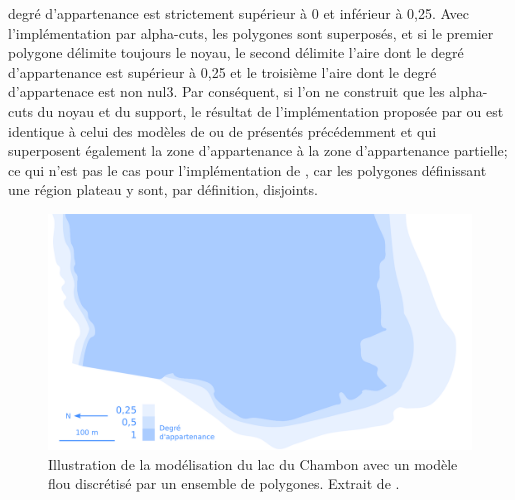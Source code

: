 degré d’appartenance est strictement supérieur à 0 et inférieur à
0,25. Avec l’implémentation par alpha-cuts, les polygones sont
superposés, et si le premier polygone délimite toujours le noyau, le
second délimite l’aire dont le degré d’appartenance est supérieur à
0,25 et le troisième l’aire dont le degré d’appartenace est non
nul3. Par conséquent, si l’on ne construit que les alpha-cuts du noyau
et du support, le résultat de l’implémentation proposée par
\textcite{Zoghalmi2013,Zoghalmi2016} ou \textcite{de Runz2008} est
identique à celui des modèles de \textcite{Cohn1996} ou de
\textcite{Clementini1996} présentés précédemment et qui superposent
également la zone d’appartenance à la zone d’appartenance partielle;
ce qui n’est pas le cas pour l’implémentation de
\textcite{Kanjinal2010}, car les polygones définissant une région
plateau y sont, par définition, disjoints.

\begin{figure}
  \centering
  \includegraphics{../figures/fig9.png}
  \caption{Illustration de la modélisation du lac du Chambon avec un
    modèle flou discrétisé par un ensemble de polygones. Extrait de
    \textcite{Bunel2020}.}
  \label{fig:champ_polygones}
\end{figure}

